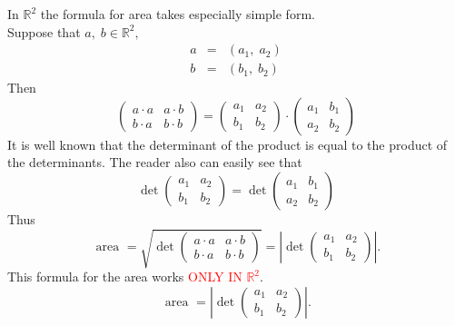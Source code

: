 \documentclass[color=black,11pt]{elegantpaper}
\begin{document}
In $\mathbb{R}^2$ the formula for area takes especially simple form.\\
Suppose that $a,\;b\in \mathbb{R}^2,$
\begin{eqnarray*}
a &=& (a_1,\;a_2)\\
b &=& (b_1,\;b_2)
\end{eqnarray*}
Then
$$
\left( \begin{array}{cc}
             a\cdot a& a\cdot b\\
             b\cdot a& b\cdot b
           \end{array} \right) = \left( \begin{array}{cc}
             a_1& a_2\\
             b_1&  b_2
           \end{array} \right)\cdot \left( \begin{array}{cc}
             a_1&  b_1\\
             a_2&  b_2
           \end{array} \right)
$$
It is well known that the determinant of the product is equal to the product of the determinants. The reader also can easily see that
$$
\det \left( \begin{array}{cc}
             a_1& a_2\\
             b_1&  b_2
           \end{array} \right) = \det \left( \begin{array}{cc}
             a_1&  b_1\\
             a_2&  b_2
           \end{array} \right)
$$
Thus
$$
\mbox{ area } = \sqrt{\det\left( \begin{array}{cc}
             a\cdot a& a\cdot b\\
             b\cdot a& b\cdot b
           \end{array} \right)}=|\det \left( \begin{array}{cc}
             a_1& a_2\\
             b_1&  b_2
           \end{array} \right)|.
$$
This formula for the area works \textcolor{red}{ONLY IN $\mathbb{R}^2$}.
$$
\mbox{ area } = |\det \left( \begin{array}{cc}
             a_1& a_2\\
             b_1&  b_2
           \end{array} \right)|.
$$
\end{document}
